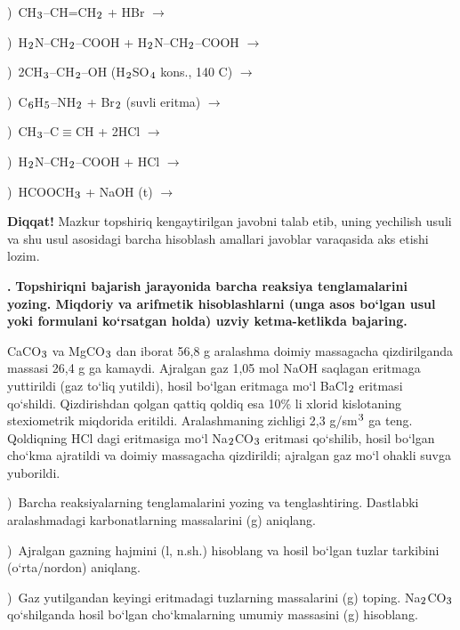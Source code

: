 \documentclass[11pt,a4paper]{article}
\renewcommand{\textsubscript}[1]{\ensuremath{_{\text{\fontsize{8}{8}\selectfont #1}}}}
\renewcommand{\textsuperscript}[1]{\ensuremath{^{\text{\fontsize{8}{8}\selectfont #1}}}}
\newcommand{\qn}[1]{\textbf{\fontsize{11.5}{13}\selectfont #1}}
\newcommand{\qsep}{\par\vspace{13pt}}
\newcommand{\diqqat}[1]{\par\smallskip\noindent\textbf{Diqqat!} #1\par\medskip}
\begin{document}
)\ CH\textsubscript{3}--CH=CH\textsubscript{2} + HBr $\to$\par
{})\ H\textsubscript{2}N--CH\textsubscript{2}--COOH + H\textsubscript{2}N--CH\textsubscript{2}--COOH $\to$\par
{})\ 2CH\textsubscript{3}--CH\textsubscript{2}--OH (H\textsubscript{2}SO\textsubscript{4} kons., 140 \textdegree{}C) $\to$\par
{})\ C\textsubscript{6}H\textsubscript{5}--NH\textsubscript{2} + Br\textsubscript{2} (suvli eritma) $\to$\par
{})\ CH\textsubscript{3}--C$\equiv$CH + 2HCl $\to$\par
{})\ H\textsubscript{2}N--CH\textsubscript{2}--COOH + HCl $\to$\par
{})\ HCOOCH\textsubscript{3} + NaOH (t) $\to$\par
\diqqat{Mazkur topshiriq kengaytirilgan javobni talab etib, uning yechilish usuli va shu usul asosidagi barcha hisoblash amallari javoblar varaqasida aks etishi lozim.}\qsep
\noindent\qn{43.} \textbf{Topshiriqni bajarish jarayonida barcha reaksiya tenglamalarini yozing. Miqdoriy va arifmetik hisoblashlarni (unga asos bo`lgan usul yoki formulani ko`rsatgan holda) uzviy ketma-ketlikda bajaring.}\par\smallskip
CaCO\textsubscript{3} va MgCO\textsubscript{3} dan iborat 56,8 g aralashma doimiy massagacha qizdirilganda massasi 26,4 g ga kamaydi. Ajralgan gaz 1,05 mol NaOH saqlagan eritmaga yuttirildi (gaz to`liq yutildi), hosil bo`lgan eritmaga mo`l BaCl\textsubscript{2} eritmasi qo`shildi. Qizdirishdan qolgan qattiq qoldiq esa 10\% li xlorid kislotaning stexiometrik miqdorida eritildi. Aralashmaning zichligi 2,3 g/sm\textsuperscript{3} ga teng. Qoldiqning HCl dagi eritmasiga mo`l Na\textsubscript{2}CO\textsubscript{3} eritmasi qo`shilib, hosil bo`lgan cho`kma ajratildi va doimiy massagacha qizdirildi; ajralgan gaz mo`l ohakli suvga yuborildi.\par
{})\ Barcha reaksiyalarning tenglamalarini yozing va tenglashtiring. Dastlabki aralashmadagi karbonatlarning massalarini (g) aniqlang.\par
{})\ Ajralgan gazning hajmini (l, n.sh.) hisoblang va hosil bo`lgan tuzlar tarkibini (o`rta/nordon) aniqlang.\par
{})\ Gaz yutilgandan keyingi eritmadagi tuzlarning massalarini (g) toping. Na\textsubscript{2}CO\textsubscript{3} qo`shilganda hosil bo`lgan cho`kmalarning umumiy massasini (g) hisoblang.\par
\end{document}
